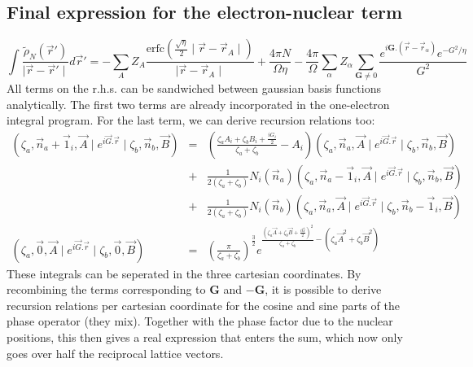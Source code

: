 \documentclass[11pt,a4paper]{article}
\begin{document}
\subsection{Final expression for the electron-nuclear term}
\begin{equation}
\int \frac{\tilde{\rho}_N(\vec{r}')}{\mid \vec{r} - \vec{r}' \mid} d\vec{r}' = - \sum\limits_A Z_A \frac{\text{erfc}\left( \frac{\sqrt{\eta}}{2} \mid \vec{r} - \vec{r}_A \mid \right)}{\mid \vec{r} - \vec{r}_A \mid} + \frac{4 \pi N}{\Omega \eta} - \frac{4 \pi}{\Omega} \sum\limits_{\alpha} Z_{\alpha} \sum\limits_{\mathbf{G} \neq 0} \frac{e^{i \mathbf{G}.(\vec{r} - \vec{r}_{\alpha})} e^{-G^2/\eta}}{G^2} \label{gjgj2}
\end{equation}
All terms on the r.h.s. can be sandwiched between gaussian basis functions analytically. The first two terms are already incorporated in the one-electron integral program. For the last term, we can derive recursion relations too:
\begin{eqnarray}
(\zeta_a,\vec{n}_a+\vec{1}_i,\vec{A} \mid e^{i \vec{G}. \vec{r}} \mid \zeta_b,\vec{n}_b,\vec{B} ) & = & \left( \frac{\zeta_a A_i + \zeta_b B_i + \frac{i G_i}{2}}{\zeta_a + \zeta_b} - A_i \right) (\zeta_a,\vec{n}_a,\vec{A} \mid e^{i \vec{G}. \vec{r}} \mid \zeta_b,\vec{n}_b,\vec{B} ) \nonumber \\
& + & \frac{1}{2(\zeta_a + \zeta_b)} N_i(\vec{n}_a) (\zeta_a,\vec{n}_a-\vec{1}_i,\vec{A} \mid e^{i \vec{G}. \vec{r}} \mid \zeta_b,\vec{n}_b,\vec{B} ) \nonumber \\
& + & \frac{1}{2(\zeta_a + \zeta_b)} N_i(\vec{n}_b) (\zeta_a,\vec{n}_a,\vec{A} \mid e^{i \vec{G}. \vec{r}} \mid \zeta_b,\vec{n}_b -\vec{1}_i,\vec{B} )\\
(\zeta_a,\vec{0},\vec{A} \mid e^{i \vec{G}. \vec{r}} \mid \zeta_b,\vec{0},\vec{B} ) & = & \left( \frac{\pi}{\zeta_a + \zeta_b} \right)^{\frac{3}{2}} e^{\frac{\left( \zeta_a \vec{A} + \zeta_b \vec{B} + \frac{i \vec{G}}{2} \right)^2}{\zeta_a + \zeta_b} - (\zeta_a \vec{A}^2 + \zeta_b \vec{B}^2)}
\end{eqnarray}
These integrals can be seperated in the three cartesian coordinates. By recombining the terms corresponding to $\mathbf{G}$ and $-\mathbf{G}$, it is possible to derive recursion relations per cartesian coordinate for the cosine and sine parts of the phase operator (they mix). Together with the phase factor due to the nuclear positions, this then gives a real expression that enters the sum, which now only goes over half the reciprocal lattice vectors.
\end{document}
